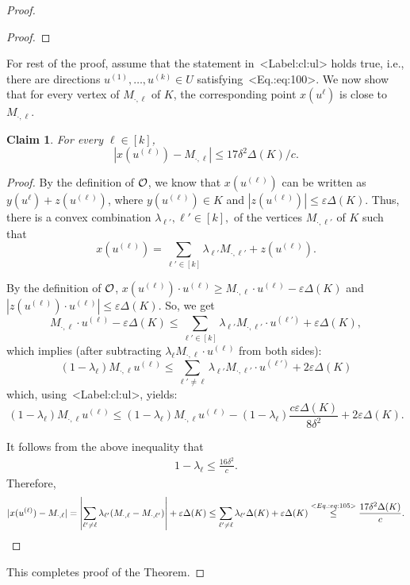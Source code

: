 \documentclass[11pt,letterpaper]{article}
\def\Cref#1{<Label:#1>}%
\def\eqref#1{<Eq.:#1>}%
\newtheorem{claim}[theorem]{Claim}
\theoremstyle{definition}
\theoremstyle{remark}
\newcommand{\uell}{{u^{(\ell)}}}
\newcommand{\Mdot}[1]{{M_{\cdot, #1}}}
\begin{document}
\begin{proof}
\begin{proof}
\end{proof}

For rest of the proof, assume that the statement in~\Cref{cl:ul} holds true, i.e., there are directions $u^{(1)}, \ldots, u^{(k)} \in U$ satisfying~\eqref{eq:100}. 
We now show that for every vertex of $\Mdot{\ell}$ of $K$, the corresponding point $x(u^{\ell})$ is close to  $\Mdot{\ell}$. 
\begin{claim}
    \label{cl:xl}
    For every $\ell \in [k]$, 
    $$|x(u^{(\ell)})-M_{\cdot,\ell}|\leq 17 \delta^2 \Delta(K)/c.$$
\end{claim}
\begin{proof}
    By the definition of $\cal O$, we know that $x(u^{(\ell)})$ can be written as $y(u^{\ell})+z(\uell)$, where $y(\uell) \in K$ and $|z(\uell)| \leq \varepsilon \Delta(K)$. Thus, there is a convex combination $\lambda_{\ell'}, \ell' \in [k],$ of the vertices $\Mdot{\ell'}$ of $K$ such that 
    $$ x(\uell) = \sum_{\ell' \in [k]} \lambda_{\ell'} \Mdot{\ell'} + z(\uell).$$
   

By the definition of $\cal O$, $x(u^{(\ell)})\cdot u^{(\ell)}\geq M_{\cdot, \ell}\cdot u^{(\ell)}-\varepsilon\Delta (K)$ and $|z(u^{(\ell)})\cdot u^{(\ell)}|\leq\varepsilon\Delta(K)$. So, we get
$$M_{\cdot,\ell}\cdot u^{(\ell)}-\varepsilon\Delta(K)\leq \sum_{\ell' \in [k]}\lambda_{\ell'} M_{\cdot,\ell'}\cdot u^{(\ell')}+\varepsilon\Delta(K),$$
which implies (after subtracting $\lambda_\ell M_{\cdot,\ell} \cdot u^{(\ell)}$ from both sides):
$$(1-\lambda_\ell) M_{\cdot,\ell}u^{(\ell)}\leq \sum_{\ell'\not= \ell} \lambda_{\ell'} M_{\cdot,\ell'}\cdot u^{(\ell')}+2\varepsilon\Delta(K)$$
which, using~\Cref{cl:ul}, yields:
$$(1-\lambda_\ell) M_{\cdot,\ell}u^{(\ell)}\leq (1-\lambda_\ell) M_{\cdot,\ell}u^{(\ell)}-(1-\lambda_\ell)\frac{c\varepsilon\Delta(K)}{8\delta^2}+2\varepsilon\Delta(K).$$


    
It follows from the above inequality that 
\begin{align}
\label{eq:105}
    1- \lambda_\ell \leq \frac{16 \delta^2}{c}.
\end{align}
    Therefore, 
\begin{align}
    |x(\uell) - \Mdot{\ell}| = \left| \sum_{\ell' \neq \ell} \lambda_{\ell'} (\Mdot{\ell} - \Mdot{\ell'})  
    \right| + \varepsilon  \Delta(K) \leq \sum_{\ell' \neq \ell} \lambda_{\ell'} \Delta(K) + \varepsilon \Delta(K) \stackrel{\eqref{eq:105}}{\leq} \frac{17 \delta^2 \Delta(K)}{c}.
    \notag
\end{align}
\end{proof}

This completes proof of the Theorem. 
\end{proof}
\end{document}

